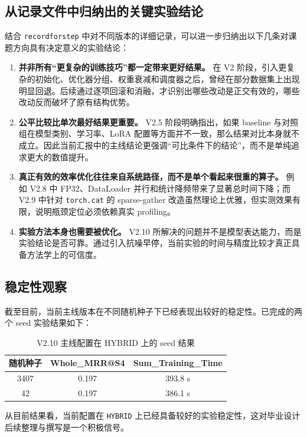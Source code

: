 \documentclass[12pt,a4paper]{ctexart}
\begin{document}
\subsection{从记录文件中归纳出的关键实验结论}
结合 \texttt{recordforstep} 中对不同版本的详细记录，可以进一步归纳出以下几条对课题方向具有决定意义的实验结论：
\begin{enumerate}
  \item \textbf{并非所有“更复杂的训练技巧”都一定带来更好结果。} 在 V2 阶段，引入更复杂的初始化、优化器分组、权重衰减和调度器之后，曾经在部分数据集上出现明显回退。后续通过逐项回滚和消融，才识别出哪些改动是正交有效的，哪些改动反而破坏了原有结构优势。
  \item \textbf{公平比较比单次最好结果更重要。} V2.5 阶段明确指出，如果 baseline 与对照组在模型类别、学习率、LoRA 配置等方面并不一致，那么结果对比本身就不成立。因此当前汇报中的主线结论更强调“可比条件下的结论”，而不是单纯追求更大的数值提升。
  \item \textbf{真正有效的效率优化往往来自系统路径，而不是单个看起来很重的算子。} 例如 V2.8 中 FP32、DataLoader 并行和统计降频带来了显著总时间下降；而 V2.9 中针对 \texttt{torch.cat} 的 sparse-gather 改造虽然理论上优雅，但实测效果有限，说明瓶颈定位必须依赖真实 profiling。
  \item \textbf{实验方法本身也需要被优化。} V2.10 所解决的问题并不是模型表达能力，而是实验结论是否可靠。通过引入抗噪早停，当前实验的时间与精度比较才真正具备方法学上的可信度。
\end{enumerate}

\subsection{稳定性观察}
截至目前，当前主线版本在不同随机种子下已经表现出较好的稳定性。已完成的两个 seed 实验结果如下：
\begin{table}[H]
\centering
\caption{V2.10 主线配置在 HYBRID 上的 seed 结果}
\begin{tabular}{ccc}
\toprule
随机种子 & Whole\_MRR@S4 & Sum\_Training\_Time \\
\midrule
3407 & 0.197 & 393.8 s \\
42 & 0.197 & 386.1 s \\
\bottomrule
\end{tabular}
\end{table}

从目前结果看，当前配置在 \texttt{HYBRID} 上已经具备较好的实验稳定性，这对毕业设计后续整理与撰写是一个积极信号。
\end{document}
